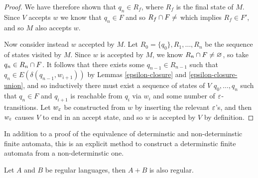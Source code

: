 \begin{proof}
    We have therefore shown that $q_n \in R_f$, where $R_f$ is the final state of $M$. Since $V$ accepts $w$ we know that $q_n \in F$ and so $R_f \intersection F \neq \empty$ which implies $R_f \in F'$, and so $M$ also accepts $w$.

    Now consider instead $w$ accepted by $M$. Let $R_0 = \{q_0\}, R_1, \ldots, R_n$ be the sequence of states visited by $M$. Since $w$ is accepted by $M$, we know $R_n \cap F \neq \varnothing$, so take $q_n \in R_n \cap F$. It follows that there exists some $q_{n-1} \in R_{n-1}$ such that $q_n \in E(\delta(q_{n-1}, w_{i+1}))$ by Lemmas \ref{epsilon-closure} and \ref{epsilon-closure-union}, and so inductively there must exist a sequence of states of $V$ $q_0, \ldots, q_n$ such that $q_n \in F$ and $q_{i+1}$ is reachable from $q_i$ via $w_i$ and some number of $\varepsilon$-transitions. Let $w_{\varepsilon}$ be constructed from $w$ by inserting the relevant $\varepsilon$'s, and then $w_{\varepsilon}$ causes $V$ to end in an accept state, and so $w$ is accepted by $V$ by definition.
\end{proof}

\begin{rmk}
    In addition to a proof of the equivalence of determinstic and non-determinstic finite automata, this is an explicit method to construct a determinstic finite automata from a non-determinstic one.
\end{rmk}

\begin{thm}\label{regular-language-concatenation}
    Let $A$ and $B$ be regular languages, then $A + B$ is also regular.
\end{thm}

